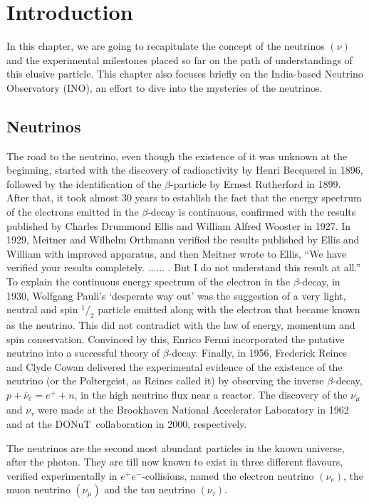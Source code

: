 
\chapter{Introduction}
In this chapter, we are going to recapitulate the concept of the
neutrinos $\left(\nu\right)$ and the experimental milestones placed
so far on the path of understandings of this elusive particle. This
chapter also focuses briefly on the India-based Neutrino Observatory
(INO), an effort to dive into the mysteries of the neutrinos.

\section{Neutrinos}
The road to the neutrino\cite{roadtoneut}, even though the existence
of it was unknown at the beginning, started with the discovery of
radioactivity by Henri Becquerel in 1896\cite{becquerel1896}, followed
by the identification of the $\beta$-particle by Ernest Rutherford in
1899\cite{rutherford1899}. After that, it took almost 30 years to
establish the fact that the energy spectrum of the electrons emitted
in the $\beta$-decay is continuous, confirmed with the results
published by Charles Drummond Ellis and William Alfred Wooster
in 1927\cite{ellis1927}. In 1929, Meitner and Wilhelm Orthmann
verified the results published by Ellis and William with improved
apparatus\cite{meitner1930}, and then Meitner wrote to Ellis,
``We have verified your results completely. ...... . But I do not understand this result at all.''\cite{lettertoCD}
To explain the continuous energy spectrum of the electron in the
$\beta$-decay, in 1930, Wolfgang Pauli's `desperate way out' was the
suggestion of a very light, neutral and spin $^1/_2$ particle emitted
along with the electron that became known as the neutrino. This did
not contradict with the law of energy, momentum and spin conservation.
Convinced by this, Enrico Fermi incorporated the putative neutrino
into a successful theory of $\beta$-decay. Finally, in 1956, Frederick
Reines and Clyde Cowan delivered the experimental evidence of the
existence of the neutrino (or the Poltergeist, as Reines called it)
by observing the inverse $\beta$-decay, $p+\overline{\nu}_e=e^++n$,
in the high neutrino flux near a reactor\cite{reines1956}.
The discovery of the $\nu_{\mu}$ and $\nu_{\tau}$ were made at
the Brookhaven National Accelerator Laboratory in
1962\cite{muonneut1962} and at the DONuT~collaboration in
2000\cite{tauneut2001}, respectively.

The neutrinos are the second most abundant particles in the known
universe, after the photon. They are till now known to exist
in three different flavours, verified experimentally in
\mbox{$e^+e^-$-collisions\cite{numberneut}}, named the electron
neutrino $\left(\nu_e\right)$, the muon neutrino
$\left(\nu_{\mu}\right)$ and the tau neutrino $\left(\nu_{\tau}\right)$.

